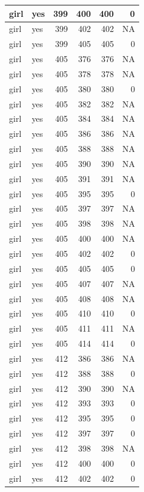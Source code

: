 \documentclass[man]{apa6}
\begin{document}
\begin{tabular}{l|l|r|r|r|r}
\hline
girl & yes & 399 & 400 & 400 & 0\\
\hline
girl & yes & 399 & 402 & 402 & NA\\
\hline
girl & yes & 399 & 405 & 405 & 0\\
\hline
girl & yes & 405 & 376 & 376 & NA\\
\hline
girl & yes & 405 & 378 & 378 & NA\\
\hline
girl & yes & 405 & 380 & 380 & 0\\
\hline
girl & yes & 405 & 382 & 382 & NA\\
\hline
girl & yes & 405 & 384 & 384 & NA\\
\hline
girl & yes & 405 & 386 & 386 & NA\\
\hline
girl & yes & 405 & 388 & 388 & NA\\
\hline
girl & yes & 405 & 390 & 390 & NA\\
\hline
girl & yes & 405 & 391 & 391 & NA\\
\hline
girl & yes & 405 & 395 & 395 & 0\\
\hline
girl & yes & 405 & 397 & 397 & NA\\
\hline
girl & yes & 405 & 398 & 398 & NA\\
\hline
girl & yes & 405 & 400 & 400 & NA\\
\hline
girl & yes & 405 & 402 & 402 & 0\\
\hline
girl & yes & 405 & 405 & 405 & 0\\
\hline
girl & yes & 405 & 407 & 407 & NA\\
\hline
girl & yes & 405 & 408 & 408 & NA\\
\hline
girl & yes & 405 & 410 & 410 & 0\\
\hline
girl & yes & 405 & 411 & 411 & NA\\
\hline
girl & yes & 405 & 414 & 414 & 0\\
\hline
girl & yes & 412 & 386 & 386 & NA\\
\hline
girl & yes & 412 & 388 & 388 & 0\\
\hline
girl & yes & 412 & 390 & 390 & NA\\
\hline
girl & yes & 412 & 393 & 393 & 0\\
\hline
girl & yes & 412 & 395 & 395 & 0\\
\hline
girl & yes & 412 & 397 & 397 & 0\\
\hline
girl & yes & 412 & 398 & 398 & NA\\
\hline
girl & yes & 412 & 400 & 400 & 0\\
\hline
girl & yes & 412 & 402 & 402 & 0\\

\end{tabular}
\end{document}
